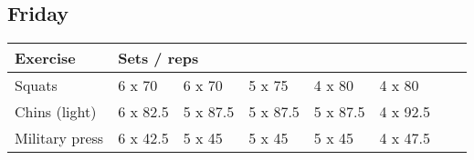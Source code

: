 \documentclass[12pt, a4paper]{article}%
\begin{document}
  \subsection*{\hspace{0.5em} Friday }


  \begin{tabular}{l|lllllll}
  \hspace{0.75em} \textbf{Exercise} & \multicolumn{ 7 }{l}{ \textbf{Sets / reps} } \\ \hline

            \hspace{0.75em} Squats
            & 6 x 70
            & 6 x 70
            & 5 x 75
            & 4 x 80
            & 4 x 80
            & 
            & 
            \\


            \hspace{0.75em} Chins (light)
            & 6 x 82.5
            & 5 x 87.5
            & 5 x 87.5
            & 5 x 87.5
            & 4 x 92.5
            & 
            & 
            \\


            \hspace{0.75em} Military press
            & 6 x 42.5
            & 5 x 45
            & 5 x 45
            & 5 x 45
            & 4 x 47.5
            & 
            & 
            \\


  \end{tabular}
\end{document}
